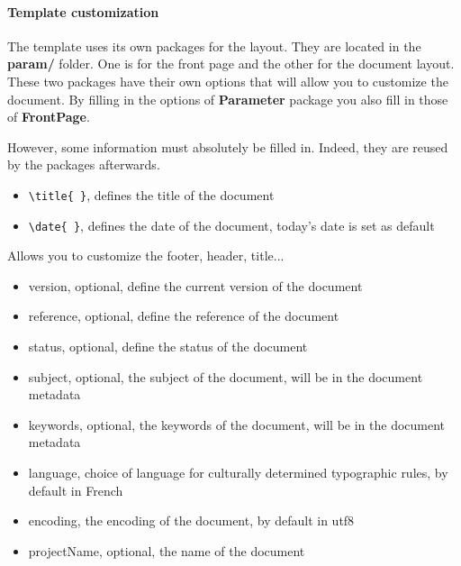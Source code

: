 \paragraph{Template customization} \label{customization}
The template uses its own packages for the layout.
They are located in the \textbf{param/} folder.
One is for the front page and the other for the document layout. These two packages have their own
options that will allow you to customize the document.
By filling in the options of \textbf{Parameter} package you also fill in those of
\textbf{FrontPage}. \newline

However, some information must absolutely be filled in. Indeed, they are reused by the packages
afterwards.
\begin{itemize}
    \item \verb=\title{ }=, defines the title of the document
    \item \verb=\date{ }=, defines the date of the document, today's date is set as default\newline
\end{itemize}

Allows you to customize the footer, header, title...
\begin{itemize}
    \item version, optional, define the current version of the document
    \item reference, optional, define the reference of the document
    \item status, optional, define the status of the document
    \item subject, optional, the subject of the document, will be in the document metadata
    \item keywords, optional, the keywords of the document, will be in the document metadata
    \item language, choice of language for culturally determined typographic rules, by default in
          French \label{language}
    \item encoding, the encoding of the document, by default in utf8
    \item projectName,  optional, the name of the document
\end{itemize}



